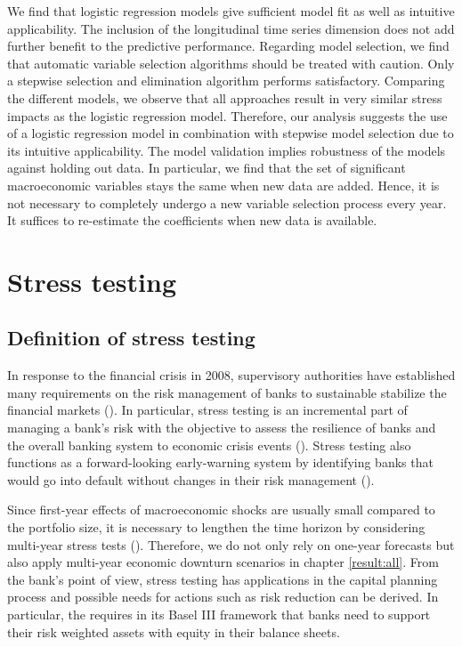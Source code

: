 \documentclass[a4paper, 11pt]{scrreprt}
\begin{document}
\bigskip

We find that logistic regression models give sufficient model fit as well as intuitive applicability. The inclusion of the longitudinal time series dimension does not add further benefit to the predictive performance. Regarding model selection, we find that automatic variable selection algorithms should be treated with caution. Only a stepwise selection and elimination algorithm performs satisfactory. Comparing the different models, we observe that all approaches result in very similar stress impacts as the logistic regression model.
Therefore, our analysis suggests the use of a logistic regression model in combination with stepwise model selection due to its intuitive applicability.
The model validation implies robustness of the models against holding out data. In particular, we find that the set of significant macroeconomic variables stays the same when new data are added.
Hence, it is not necessary to completely undergo a new variable selection process every year. It suffices to re-estimate the coefficients when new data is available. 



\chapter{Stress testing}\label{par:stresstesting}

\section{Definition of stress testing}\label{par:definitionstress}


In response to the financial crisis in 2008, supervisory authorities have established many requirements on the risk management of banks to sustainable stabilize the financial markets (\textcite[chapter 2.5]{bis2004sorge}). In particular, stress testing is an incremental part of managing a bank's risk with the objective to assess the resilience of banks and the overall banking system to economic crisis events (\textcite[note 2]{eba2018stresstest}). 
Stress testing also functions as a forward-looking early-warning system by identifying banks that would go into default without changes in their risk management (\textcite{bcbs2012macroprudential}).

Since first-year effects of macroeconomic shocks are usually small compared to the portfolio size, it is necessary to lengthen the time horizon by considering multi-year stress tests (\textcite[chapter 4.1.2]{bis2004sorge}). Therefore, we do not only rely on one-year forecasts but also apply multi-year economic downturn scenarios in chapter \ref{result:all}.
From the bank's point of view, stress testing has applications in the capital planning process and possible needs for actions such as risk reduction can be derived.
In particular, the \textcite{bcbs2010baselIII} requires in its Basel III framework that banks need to support their risk weighted assets with equity in their balance sheets.
\end{document}
